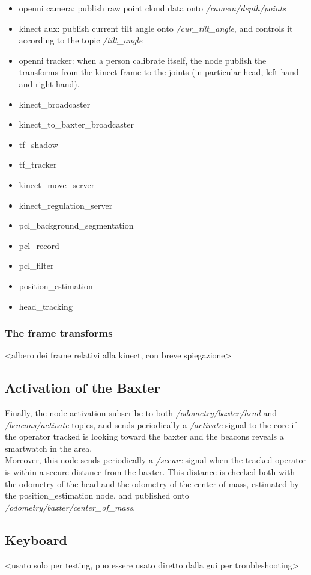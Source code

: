 \documentclass[12pt]{article}
\begin{document}
{\begin{itemize}
\item openni camera: publish raw point cloud data onto \textit{/camera/depth/points}
\item kinect aux: publish current tilt angle onto \textit{/cur\_tilt\_angle}, and controls it according to the topic \textit{/tilt\_angle}
\item openni tracker: when a person calibrate itself, the node publish the transforms from the kinect frame to the joints (in particular head, left hand and right hand). 
\item kinect\_broadcaster
\item kinect\_to\_baxter\_broadcaster
\item tf\_shadow
\item tf\_tracker
\item kinect\_move\_server
\item kinect\_regulation\_server
\item pcl\_background\_segmentation
\item pcl\_record
\item pcl\_filter
\item position\_estimation
\item head\_tracking
\end{itemize}

\subsubsection{The frame transforms}
<albero dei frame relativi alla kinect, con breve spiegazione>

\subsection{Activation of the Baxter}
Finally, the node activation subscribe to both \textit{/odometry/baxter/head} and \textit{/beacons/activate} topics, and sends periodically a \textit{/activate} signal to the core if the operator tracked is looking toward the baxter and the beacons reveals a smartwatch in the area. \\Moreover, this node sends periodically a \textit{/secure} signal when the tracked operator is within a secure distance from the baxter. This distance is checked both with the odometry of the head and the odometry of the center of mass, estimated by the position\_estimation node, and published onto \textit{/odometry/baxter/center\_of\_mass}.

\subsection{Keyboard}
<usato solo per testing, puo essere usato diretto dalla gui per troubleshooting>

}
\end{document}
